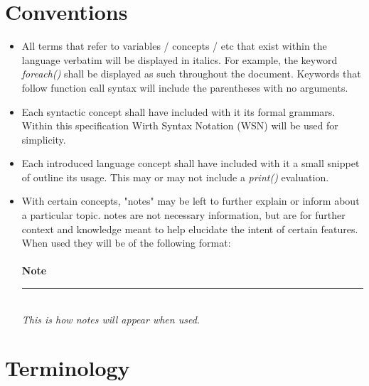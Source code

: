 \documentclass[12pt,letterpaper]{report}
\newcommand{\noteline}{\noindent\textbf{Note}\\\noindent\rule{5cm}{0.4pt}\\}
\begin{document}
\section{Conventions}\label{Conventions}
\begin{itemize}
  \item All terms that refer to variables / concepts / etc that exist within the language verbatim will 
  be displayed in italics. For example, the keyword \textit{foreach()} shall be displayed as such 
  throughout the document. Keywords that follow function call syntax will include the parentheses with 
  no arguments.
  
  \item Each syntactic concept shall have included with it its formal grammars. Within this specification 
  Wirth Syntax Notation (WSN) will be used for simplicity.

  \item Each introduced language concept shall have included with it a small snippet of outline its usage. This 
  may or may not include a \textit{print()} evaluation.

  

  \item With certain concepts, "notes" may be left to further explain or inform about a particular topic. notes are 
        not necessary information, but are for further context and knowledge meant to help elucidate the 
        intent of certain features. When used they will be of the following format:\\\\
  \noteline
  \textit{This is how notes will appear when used.}

\end{itemize}
\section{Terminology}\label{Terminology}
\end{document}
